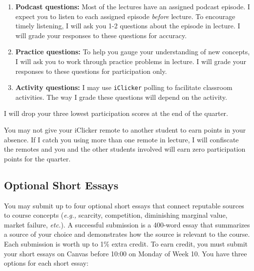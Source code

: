 \documentclass[11pt]{article}
\begin{document}
\begin{enumerate}
	\setlength{\itemsep}{0pt}
	\item \textbf{Podcast questions:} Most of the lectures have an assigned podcast episode. I expect you to listen to each assigned episode \textit{before} lecture. To encourage timely listening, I will ask you 1-2 questions about the episode in lecture. I will grade your responses to these questions for accuracy.
	\item \textbf{Practice questions:} To help you gauge your understanding of new concepts, I will ask you to work through practice problems in lecture. I will grade your responses to these questions for participation only.
	\item \textbf{Activity questions:} I may use \texttt{iClicker} polling to facilitate classroom activities. The way I grade these questions will depend on the activity.
\end{enumerate}

\noindent I will drop your three lowest participation scores at the end of the quarter.

You may not give your iClicker remote to another student to earn points in your absence. If I catch you using more than one remote in lecture, I will confiscate the remotes and you and the other students involved will earn zero participation points for the quarter. 

\subsection*{Optional Short Essays}

You may submit up to four optional short essays that connect reputable sources to course concepts (\textit{e.g.,} scarcity, competition, diminishing marginal value, market failure, \textit{etc.}). A successful submission is a 400-word essay that summarizes a source of your choice and demonstrates how the source is relevant to the course. Each submission is worth up to 1\% extra credit. To earn credit, you must submit your short essays on Canvas before 10:00 on Monday of Week 10. You have three options for each short essay:
\end{document}
